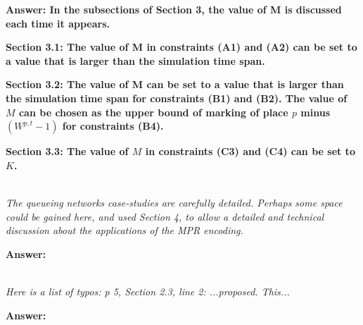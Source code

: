 \documentclass[suppldata]{interact}
\begin{document}
\noindent
\textbf{Answer: In the subsections of Section 3, the value of M is discussed each time it appears.}


\textbf{Section 3.1: The value of M in constraints (A1) and (A2) can be set to a value that is larger than the simulation time span.}

\textbf{Section 3.2: The value of M can be set to a value that is larger than the simulation time span for constraints (B1) and (B2).  The value of $M$ can be chosen as the upper bound of marking of place $p$ minus $(W^{p,t}-1)$ for constraints (B4). }


\textbf{Section 3.3: The value of $M$ in constraints (C3) and (C4) can be set to $K$. }

~\\


\textit{The queueing networks case-studies are carefully detailed. Perhaps
some space could be gained here, and used Section 4, to allow a
detailed and technical discussion about the applications of the MPR
encoding.}

\noindent
\textbf{Answer:}


~\\
\textit{Here is a list of typos: p 5, Section 2.3, line 2: ...proposed. This...}

\noindent
\textbf{Answer:}





\end{document}
